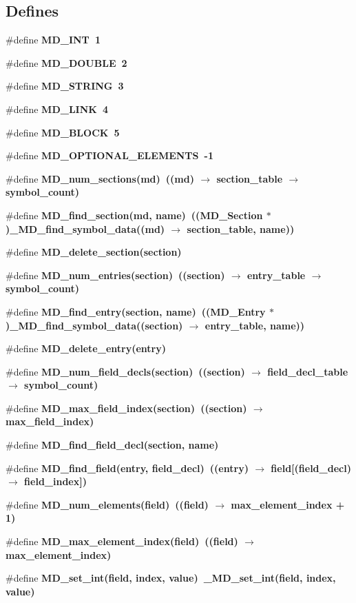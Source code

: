 \subsection*{Defines}
\begin{CompactItemize}
\item 
\#define \bf{MD\_\-INT}~1
\item 
\#define \bf{MD\_\-DOUBLE}~2
\item 
\#define \bf{MD\_\-STRING}~3
\item 
\#define \bf{MD\_\-LINK}~4
\item 
\#define \bf{MD\_\-BLOCK}~5
\item 
\#define \bf{MD\_\-OPTIONAL\_\-ELEMENTS}~-1
\item 
\#define \bf{MD\_\-num\_\-sections}(md)~((md) $\rightarrow$ section\_\-table $\rightarrow$ symbol\_\-count)
\item 
\#define \bf{MD\_\-find\_\-section}(md, \bf{name})~((\bf{MD\_\-Section} $\ast$)\_\-MD\_\-find\_\-symbol\_\-data((md) $\rightarrow$ section\_\-table, \bf{name}))
\item 
\#define \bf{MD\_\-delete\_\-section}(section)
\item 
\#define \bf{MD\_\-num\_\-entries}(section)~((section) $\rightarrow$ entry\_\-table $\rightarrow$ symbol\_\-count)
\item 
\#define \bf{MD\_\-find\_\-entry}(section, \bf{name})~((\bf{MD\_\-Entry} $\ast$)\_\-MD\_\-find\_\-symbol\_\-data((section) $\rightarrow$ entry\_\-table, \bf{name}))
\item 
\#define \bf{MD\_\-delete\_\-entry}(\bf{entry})
\item 
\#define \bf{MD\_\-num\_\-field\_\-decls}(section)~((section) $\rightarrow$ field\_\-decl\_\-table $\rightarrow$ symbol\_\-count)
\item 
\#define \bf{MD\_\-max\_\-field\_\-index}(section)~((section) $\rightarrow$ max\_\-field\_\-index)
\item 
\#define \bf{MD\_\-find\_\-field\_\-decl}(section, \bf{name})
\item 
\#define \bf{MD\_\-find\_\-field}(\bf{entry}, field\_\-decl)~((\bf{entry}) $\rightarrow$ field[(field\_\-decl) $\rightarrow$ field\_\-index])
\item 
\#define \bf{MD\_\-num\_\-elements}(field)~((field) $\rightarrow$ max\_\-element\_\-index + 1)
\item 
\#define \bf{MD\_\-max\_\-element\_\-index}(field)~((field) $\rightarrow$ max\_\-element\_\-index)
\item 
\#define \bf{MD\_\-set\_\-int}(field, index, value)~\_\-MD\_\-set\_\-int(field, index, value)

\end{CompactItemize}
